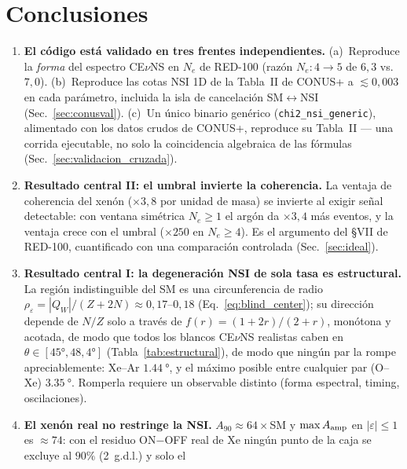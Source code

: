 \documentclass[11pt,a4paper]{article}
\newcommand{\eps}{\varepsilon}
\newcommand{\QW}{Q_{W}}
\newcommand{\Ne}{N_{e}}
\newcommand{\Aamp}{A_{\rm amp}}
\newcommand{\code}[1]{\texttt{#1}}
\begin{document}
\section{Conclusiones}
\label{sec:conclusiones}

\begin{enumerate}\itemsep4pt
  \item \textbf{El c\'odigo est\'a validado en tres frentes independientes.}
    (a)~Reproduce la \emph{forma} del espectro CE$\nu$NS en $\Ne$ de
    RED-100 (raz\'on $\Ne\!:\!4\!\to\!5$ de $6{,}3$ vs.\ $7{,}0$).
    (b)~Reproduce las cotas NSI 1D de la Tabla~II de CONUS+ a $\lesssim 0{,}003$
    en cada par\'ametro, incluida la isla de cancelaci\'on SM$\leftrightarrow$NSI
    (Sec.~\ref{sec:conusval}). (c)~Un \'unico binario gen\'erico
    (\code{chi2\_nsi\_generic}), alimentado con los datos crudos de
    CONUS+, reproduce su Tabla~II --- una corrida ejecutable,
    no solo la coincidencia algebraica de las f\'ormulas
    (Sec.~\ref{sec:validacion_cruzada}).
  \item \textbf{Resultado central II: el umbral invierte la coherencia.} La
    ventaja de coherencia del xen\'on ($\times 3{,}8$ por unidad de masa) se
    invierte al exigir se\~nal detectable: con ventana sim\'etrica $\Ne\ge 1$ el
    arg\'on da $\times 3{,}4$ m\'as eventos, y la ventaja crece con el umbral
    ($\times 250$ en $\Ne\ge 4$). Es el argumento del \S VII de RED-100,
    cuantificado con una comparaci\'on controlada (Sec.~\ref{sec:ideal}).
  \item \textbf{Resultado central I: la degeneraci\'on NSI de sola tasa es
    estructural.} La regi\'on indistinguible del SM es una circunferencia de
    radio $\rho_{\eps}=|\QW|/(Z+2N)\approx 0{,}17$--$0{,}18$
    (Eq.~\eqref{eq:blind_center}); su direcci\'on depende de $N/Z$ solo a trav\'es
    de $f(r)=(1+2r)/(2+r)$, mon\'otona y acotada, de modo que todos los blancos
    CE$\nu$NS realistas caben en $\theta\in[45\si{\degree},48{,}4\si{\degree}]$
    (Tabla~\ref{tab:estructural}), de modo que ning\'un par la rompe
    apreciablemente: Xe--Ar $\SI{1.44}{\degree}$, y el m\'aximo posible entre
    cualquier par (O--Xe) $\SI{3.35}{\degree}$. Romperla requiere un observable
    distinto (forma espectral, timing, oscilaciones).
  \item \textbf{El xen\'on real no restringe la NSI.} $A_{90}\approx 64\times$SM
    y $\max\Aamp$ en $|\eps|\le 1$ es $\approx 74$: con el residuo ON$-$OFF real
    de Xe ning\'un punto de la caja se excluye al $90\%$ (2~g.d.l.) y solo el

\end{enumerate}
\end{document}
